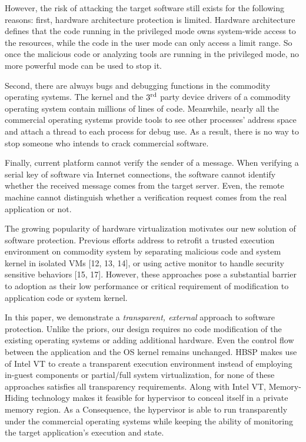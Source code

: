 \documentclass[conference]{IEEEtran}
\begin{document}
However, the risk of attacking the target software still exists
for the following reasons: first, hardware architecture protection
is limited. Hardware architecture defines that the code running in
the privileged mode owns system-wide access to the resources,
while the code in the user mode can only access a limit
range\cite{IEEEhowto:21}. So once the malicious code or analyzing
tools are running in the privileged mode, no more powerful mode
can be used to stop it.

Second, there are always bugs and debugging functions in the
commodity operating systems. The kernel and the $\text3^\text{rd}$
party device drivers of a commodity operating system contain
millions of lines of code\cite{IEEEhowto:7}. Meanwhile, nearly all
the commercial operating systems provide tools to see other
processes' address space and attach a thread to each process for
debug use. As a result, there is no way to stop someone who
intends to crack commercial software.

Finally, current platform cannot verify the sender of a message.
When verifying a serial key of software via Internet connections,
the software cannot identify whether the received message comes
from the target server. Even, the remote machine cannot
distinguish whether a verification request comes from the real
application or not.

The growing popularity of hardware virtualization motivates our
new solution of software protection. Previous efforts address to
retrofit a trusted execution environment on commodity system by
separating malicious code and system kernel in isolated VMs [12,
13, 14], or using active monitor to handle security sensitive
behaviors [15, 17]. However, these approaches pose a substantial
barrier to adoption as their low performance or critical
requirement of modification to application code or system kernel.

In this paper, we demonstrate a \emph{transparent, external}
approach to software protection. Unlike the priors, our design
requires no code modification of the existing operating systems or
adding additional hardware. Even the control flow between the
application and the OS kernel remains unchanged. HBSP makes use of
Intel VT to create a transparent execution environment instead of
employing in-guest components or partial/full system
virtualization, for none of these approaches satisfies all
transparency requirements. Along with Intel VT, Memory-Hiding
technology makes it feasible for hypervisor to conceal itself in a
private memory region. As a Consequence, the hypervisor is able to
run transparently under the commercial operating systems while
keeping the ability of monitoring the target application's
execution and state.
\end{document}
